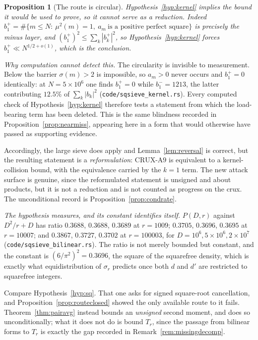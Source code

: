 \documentclass[11pt]{article}
\newtheorem{proposition}[theorem]{Proposition}
\theoremstyle{definition}
\begin{document}
\begin{proposition}[The route is circular]\label{prop:circular}
Hypothesis~\textup{\ref{hyp:kernel}} implies the bound it would be used to prove, so it cannot serve
as a reduction. Indeed $b^{+}_1=\#\{m\le N:\ \mu^2(m)=1,\ a_m\ \text{is a positive perfect square}\}$ is precisely
the minus layer, and $(b^{+}_1)^2\le\sum_k|b^{+}_k|^2$, so
Hypothesis~\textup{\ref{hyp:kernel}} forces $b^{+}_1\ll N^{1/2+o(1)}$, which is the conclusion.
\end{proposition}

\emph{Why computation cannot detect this.} The circularity is invisible to measurement. Below the barrier $\sigma(m)>2$ is impossible, so
$a_m>0$ never occurs and $b^{+}_1=0$ identically: at $N=5\times10^6$ one finds $b^{+}_1=0$ while
$b^{-}_1=1213$, the latter contributing $12.5\%$ of $\sum_k|b_k|^2$
\textup{(\texttt{code/sqsieve\_kernel.rs})}. Every computed check of
Hypothesis~\ref{hyp:kernel} therefore tests a statement from which the load-bearing term has been
deleted. This is the same blindness recorded in Proposition~\ref{prop:nearmiss}, appearing here in a
form that would otherwise have passed as supporting evidence.

Accordingly, the large sieve does apply and Lemma~\ref{lem:reversal} is correct, but the resulting
statement is a \emph{reformulation}: $\mathrm{CRUX}\text{-}\mathrm{A}9$ is equivalent to a kernel-collision
bound, with the equivalence carried by the $k=1$ term. The new attack surface is genuine, since the
reformulated statement is unsigned and about products, but it is not a reduction and is not counted
as progress on the crux. The unconditional record is Proposition~\ref{prop:condrate}.


\emph{The hypothesis measures, and its constant identifies itself.} $P(D,r)$ against $D^2/r+D$ has ratio $0.3688$, $0.3688$, $0.3689$ at $r=1009$;
$0.3705$, $0.3696$, $0.3695$ at $r=10007$; and $0.3867$, $0.3727$, $0.3702$ at $r=100003$, for
$D=10^6,5\times10^6,2\times10^7$ \textup{(\texttt{code/sqsieve\_bilinear.rs})}. The ratio is not
merely bounded but constant, and the constant is $(6/\pi^2)^2=0.3696$, the square of the squarefree
density, which is exactly what equidistribution of $\sigma_r$ predicts once both $d$ and $d'$ are
restricted to squarefree integers.

Compare Hypothesis~\ref{hyp:sq}. That one asks for signed square-root
cancellation, and Proposition~\ref{prop:routeclosed} showed the only available route to it fails.
Theorem~\ref{thm:pairavg} instead bounds an \emph{unsigned} second moment, and does so
unconditionally; what it does not do is bound $T_r$, since the passage from bilinear forms to $T_r$
is exactly the gap recorded in Remark~\ref{rem:missingdecomp}.
\end{document}
